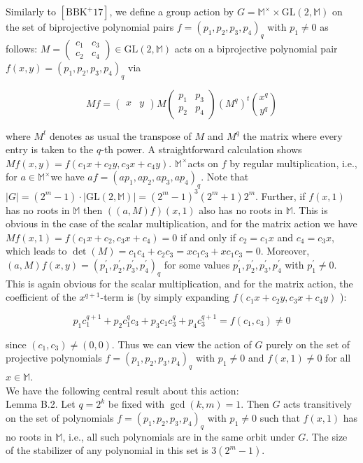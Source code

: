\documentclass[10pt]{article}
\begin{document}
Similarly to $\left[\mathrm{BBK}^{+} 17\right]$, we define a group action by $G=\mathbb{M}^{\times} \times \mathrm{GL}(2, \mathbb{M})$ on the set of biprojective polynomial pairs $f=\left(p_{1}, p_{2}, p_{3}, p_{4}\right)_{q}$ with $p_{1} \neq 0$ as follows: $M=\left(\begin{array}{ll}c_{1} & c_{3} \\ c_{2} & c_{4}\end{array}\right) \in \mathrm{GL}(2, \mathbb{M})$ acts on a biprojective polynomial pair $f(x, y)=\left(p_{1}, p_{2}, p_{3}, p_{4}\right)_{q}$ via

$$
M f=\left(\begin{array}{ll}
x & y
\end{array}\right) M\left(\begin{array}{ll}
p_{1} & p_{3} \\
p_{2} & p_{4}
\end{array}\right)\left(M^{q}\right)^{t}\binom{x^{q}}{y^{q}}
$$

where $M^{t}$ denotes as usual the transpose of $M$ and $M^{q}$ the matrix where every entry is taken to the $q$-th power. A straightforward calculation shows $M f(x, y)=f\left(c_{1} x+c_{2} y, c_{3} x+c_{4} y\right)$. $\mathbb{M}^{\times}$acts on $f$ by regular multiplication, i.e., for $a \in \mathbb{M}^{\times}$we have $a f=\left(a p_{1}, a p_{2}, a p_{3}, a p_{4}\right)_{q}$. Note that $|G|=\left(2^{m}-1\right) \cdot|\mathrm{GL}(2, \mathbb{M})|=\left(2^{m}-1\right)^{3}\left(2^{m}+1\right) 2^{m}$. Further, if $f(x, 1)$ has no roots in $\mathbb{M}$ then $((a, M) f)(x, 1)$ also has no roots in $\mathbb{M}$. This is obvious in the case of the scalar multiplication, and for the matrix action we have $M f(x, 1)=f\left(c_{1} x+c_{2}, c_{3} x+c_{4}\right)=0$ if and only if $c_{2}=c_{1} x$ and $c_{4}=c_{3} x$, which leads to $\operatorname{det}(M)=c_{1} c_{4}+c_{2} c_{3}=x c_{1} c_{3}+x c_{1} c_{3}=0$. Moreover, $(a, M) f(x, y)=\left(p_{1}^{\prime}, p_{2}^{\prime}, p_{3}^{\prime}, p_{4}^{\prime}\right)_{q}$ for some values $p_{1}^{\prime}, p_{2}^{\prime}, p_{3}^{\prime}, p_{4}^{\prime}$ with $p_{1}^{\prime} \neq 0$. This is again obvious for the scalar multiplication, and for the matrix action, the coefficient of the $x^{q+1}$-term is (by simply expanding $f\left(c_{1} x+c_{2} y, c_{3} x+c_{4} y\right)$ ):

$$
p_{1} c_{1}^{q+1}+p_{2} c_{1}^{q} c_{3}+p_{3} c_{1} c_{3}^{q}+p_{4} c_{3}^{q+1}=f\left(c_{1}, c_{3}\right) \neq 0
$$

since $\left(c_{1}, c_{3}\right) \neq(0,0)$. Thus we can view the action of $G$ purely on the set of projective polynomials $f=\left(p_{1}, p_{2}, p_{3}, p_{4}\right)_{q}$ with $p_{1} \neq 0$ and $f(x, 1) \neq 0$ for all $x \in \mathbb{M}$.\\
We have the following central result about this action:\\
Lemma B.2. Let $q=2^{k}$ be fixed with $\operatorname{gcd}(k, m)=1$. Then $G$ acts transitively on the set of polynomials $f=\left(p_{1}, p_{2}, p_{3}, p_{4}\right)_{q}$ with $p_{1} \neq 0$ such that $f(x, 1)$ has no roots in $\mathbb{M}$, i.e., all such polynomials are in the same orbit under $G$. The size of the stabilizer of any polynomial in this set is $3\left(2^{m}-1\right)$.
\end{document}
